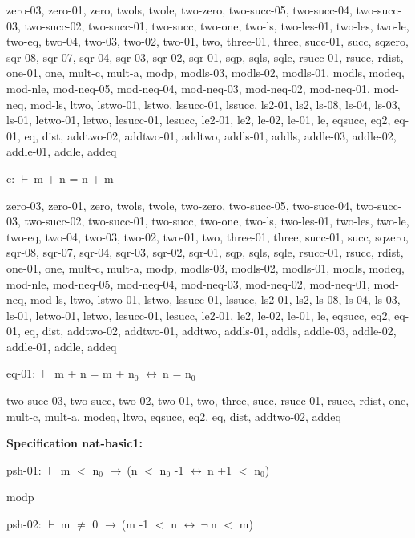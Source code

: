\documentclass[a4paper]{article}
\newcommand{\Fol}{\mbox{$\vdash\ $}}
\newcommand{\Not}{\mbox{$\neg\ $}}
\newcommand{\Imp}{\mbox{$\rightarrow\ $}}
\newcommand{\Equiv}{\mbox{$\leftrightarrow\ $}}
\begin{document}
zero-03, zero-01, zero, twols, twole, two-zero, two-succ-05, two-succ-04, two-succ-03, two-succ-02, two-succ-01, two-succ, two-one, two-ls, two-les-01, two-les, two-le, two-eq, two-04, two-03, two-02, two-01, two, three-01, three, succ-01, succ, sqzero, sqr-08, sqr-07, sqr-04, sqr-03, sqr-02, sqr-01, sqp, sqls, sqle, rsucc-01, rsucc, rdist, one-01, one, mult-c, mult-a, modp, modls-03, modls-02, modls-01, modls, modeq, mod-nle, mod-neq-05, mod-neq-04, mod-neq-03, mod-neq-02, mod-neq-01, mod-neq, mod-ls, ltwo, lstwo-01, lstwo, lssucc-01, lssucc, ls2-01, ls2, ls-08, ls-04, ls-03, ls-01, letwo-01, letwo, lesucc-01, lesucc, le2-01, le2, le-02, le-01, le, eqsucc, eq2, eq-01, eq, dist, addtwo-02, addtwo-01, addtwo, addls-01, addls, addle-03, addle-02, addle-01, addle, addeq

\bigskip

c: 
 \Fol m + n = n + m



zero-03, zero-01, zero, twols, twole, two-zero, two-succ-05, two-succ-04, two-succ-03, two-succ-02, two-succ-01, two-succ, two-one, two-ls, two-les-01, two-les, two-le, two-eq, two-04, two-03, two-02, two-01, two, three-01, three, succ-01, succ, sqzero, sqr-08, sqr-07, sqr-04, sqr-03, sqr-02, sqr-01, sqp, sqls, sqle, rsucc-01, rsucc, rdist, one-01, one, mult-c, mult-a, modp, modls-03, modls-02, modls-01, modls, modeq, mod-nle, mod-neq-05, mod-neq-04, mod-neq-03, mod-neq-02, mod-neq-01, mod-neq, mod-ls, ltwo, lstwo-01, lstwo, lssucc-01, lssucc, ls2-01, ls2, ls-08, ls-04, ls-03, ls-01, letwo-01, letwo, lesucc-01, lesucc, le2-01, le2, le-02, le-01, le, eqsucc, eq2, eq-01, eq, dist, addtwo-02, addtwo-01, addtwo, addls-01, addls, addle-03, addle-02, addle-01, addle, addeq

\bigskip

eq-01: 
 \Fol m + n = m + $\mbox{n}_{0}$ \Equiv n = $\mbox{n}_{0}$



two-succ-03, two-succ, two-02, two-01, two, three, succ, rsucc-01, rsucc, rdist, one, mult-c, mult-a, modeq, ltwo, eqsucc, eq2, eq, dist, addtwo-02, addeq

\bigskip

{\bf Specification nat-basic1:}

psh-01: 
 \Fol m $<$ $\mbox{n}_{0}$ \Imp (n $<$ $\mbox{n}_{0}$ -1 \Equiv n +1 $<$ $\mbox{n}_{0}$)



modp

\bigskip

psh-02: 
 \Fol m $\neq$ 0 \Imp (m -1 $<$ n \Equiv \Not n $<$ m)
\end{document}
